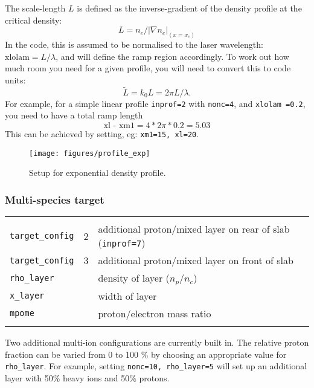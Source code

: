 \documentclass[11pt]{article}
\begin{document}
The scale-length $L$ is defined as the inverse-gradient of the density profile at the critical density:
$$
L = n_e/|\nabla n_e|_{(x=x_c)}
$$
In the code, this is assumed to be normalised to the laser wavelength:  $\mbox{xlolam}=L/\lambda$, and will define the ramp region accordingly.  To work out how much room you need for a given profile, you will need to convert this to code units:
$$
\tilde{L} = k_0 L = 2\pi L/\lambda.
$$
For example, for a simple linear profile \texttt{inprof=2} with \texttt{nonc=4}, and \texttt{xlolam =0.2}, you need to have a total ramp length
$$
\mbox{xl - xm1} = 4*2\pi*0.2 = 5.03
$$
This can be achieved by setting, eg: \texttt{xm1=15, xl=20}. 

\begin{figure}[htb]
\begin{center}
\texttt{[image: figures/profile\_exp]}
\caption{Setup for exponential density profile.}
\end{center}
\end{figure}

\subsubsection{Multi-species target} 

\begin{tabular}{lrl}
\hline\\
\texttt{target\_config}& 2 & additional proton/mixed layer on rear of slab (\texttt{inprof=7}) \\ 
\texttt{target\_config}& 3 & additional proton/mixed layer on front of slab \\ 
\texttt{rho\_layer} & & density of layer ($n_p/n_c$) \\
\texttt{x\_layer} & & width of layer \\
\texttt{mpome} & & proton/electron mass ratio \\ \hline \\ 
\end{tabular}

Two additional multi-ion configurations are currently built in.  The relative proton fraction can be
varied from 0 to 100 \% by choosing an appropriate value for \texttt{rho\_layer}.  For example, setting 
\texttt{nonc=10, rho\_layer=5} will set up an additional layer with 50\% heavy ions and 50\% protons.
\end{document}
